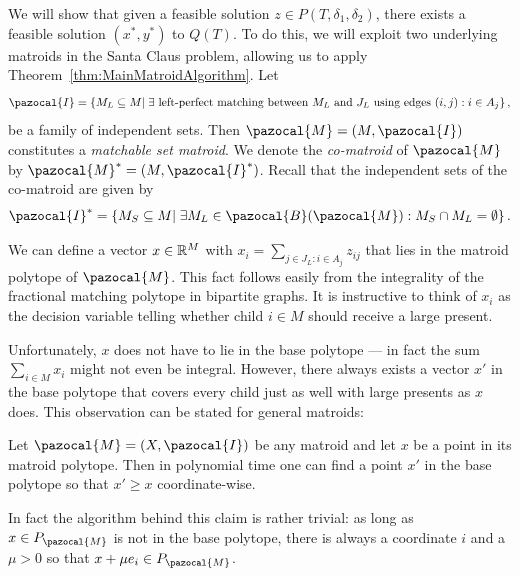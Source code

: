 We will show that given a feasible solution $z \in P(T, \delta_1,\delta_2)$, there exists a feasible solution $(x^*,y^*)$ to $Q(T)$. To do this, we will exploit two underlying matroids in the Santa Claus problem, allowing us to apply Theorem~\ref{thm:MainMatroidAlgorithm}. Let 
\[
  \pazocal{I} = \left\{M_L \subseteq M |\; \exists \text{ left-perfect matching between } M_L\textrm{ and }J_L\textrm{ using edges }(i,j): i \in A_j\right\}, 
\]
be a family of independent sets. Then  $\pazocal{M} = (M,\pazocal{I})$ constitutes a \emph{matchable set matroid}.
We denote the \emph{co-matroid} of $\pazocal{M}$ by $\pazocal{M}^* = (M, \pazocal{I}^*)$. Recall that the  independent sets 
of the co-matroid are given by
\[
  \pazocal{I}^* = \left\{M_S \subseteq M | \; \exists  M_L \in \pazocal{B}(\pazocal{M}):  M_S \cap M_L = \emptyset \right\}.
\]


We can define a vector $x \in \mathbb{R}^M$ with 
$ 
x_i = \sum_{j \in J_L: i \in A_j} z_{ij}
$
that lies in the matroid polytope of $\pazocal{M}$. This fact follows easily from the integrality of the fractional matching polytope in bipartite graphs. It is instructive to think of $x_i$ as the decision variable telling whether child $i \in M$ should receive a large present.

Unfortunately, $x$ does not have to lie in the base polytope --- in fact the sum $\sum_{i \in M} x_i$ might not even be integral. 
However, there always exists a vector $x'$ in the base polytope that covers
every child just as well with large presents as $x$ does. 
This observation can be stated for general matroids: 
\begin{lemma}\label{lem: RoundToBasePolytope}
Let $\pazocal{M} = (X,\pazocal{I})$ be any matroid and let $x$ be a point in its matroid polytope. Then in polynomial time one can find a point $x'$ in the base polytope so that $x' \geq x$ coordinate-wise. 
\end{lemma}
In fact the algorithm behind this claim is rather trivial: as long as $x \in P_{\pazocal{M}}$ is not in the base polytope, there is always a coordinate $i$ and a $\mu>0$ so that $x+\mu e_i \in P_{\pazocal{M}}$.

